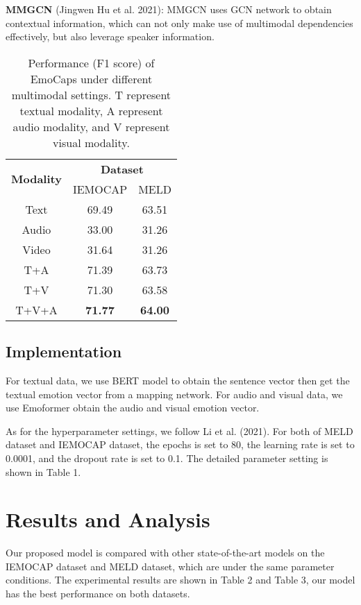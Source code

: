 \noindent\textbf{MMGCN} (Jingwen Hu et al. 2021): MMGCN uses GCN network to obtain contextual information, which can not only make use of multimodal dependencies effectively, but also leverage speaker information.
\begin{table}[]
	\centering
	\begin{tabular}{c|c|c}
		\hline
		\multirow{2}{*}{\textbf{Modality}} & \multicolumn{2}{c}{\textbf{Dataset}} \\ \cline{2-3} 
		& IEMOCAP           & MELD              \\ \hline
		Text                               & 69.49             & 63.51             \\
		Audio                              & 33.00             & 31.26             \\
		Video                              & 31.64             & 31.26             \\
		T+A                                & 71.39             & 63.73             \\
		T+V                                & 71.30             & 63.58             \\
		T+V+A                              & \textbf{71.77}    & \textbf{64.00}    \\ \hline
	\end{tabular}
	\caption{Performance (F1 score) of EmoCaps under different multimodal settings. T represent textual modality, A represent audio modality, and V represent visual modality.}
\end{table}
\subsection{Implementation}
For textual data, we use BERT model to obtain the sentence vector then get the textual emotion vector from a mapping network. For audio and visual data, we use Emoformer obtain the audio and visual emotion vector. 

As for the hyperparameter settings, we follow Li et al. (2021). For both of MELD dataset and IEMOCAP dataset, the epochs is set to 80, the learning rate is set to 0.0001, and the dropout rate is set to 0.1. The detailed parameter setting is shown in Table 1.

\section{Results and Analysis}
Our proposed model is compared with other state-of-the-art models on the IEMOCAP dataset and MELD dataset, which are under the same parameter conditions. The experimental results are shown in Table 2 and Table 3, our model has the best performance on both datasets.

